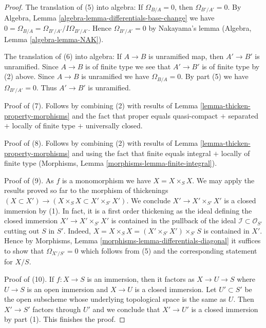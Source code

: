 \begin{proof}
\medskip\noindent
The translation of (5) into algebra: If $\Omega_{B/A} = 0$, then
$\Omega_{B'/A'} = 0$. By
Algebra, Lemma \ref{algebra-lemma-differentials-base-change}
we have $0 = \Omega_{B/A} = \Omega_{B'/A'}/I\Omega_{B'/A'}$.
Hence $\Omega_{B'/A'} = 0$ by
Nakayama's lemma (Algebra, Lemma \ref{algebra-lemma-NAK}).

\medskip\noindent
The translation of (6) into algebra: If $A \to B$ is unramified
map, then $A' \to B'$ is unramified. Since $A \to B$ is of finite
type we see that $A' \to B'$ is of finite type by (2) above.
Since $A \to B$ is unramified we have $\Omega_{B/A} = 0$. By
part (5) we have $\Omega_{B'/A'} = 0$. Thus $A' \to B'$ is unramified.

\medskip\noindent
Proof of (7). Follows by combining (2) with
results of Lemma \ref{lemma-thicken-property-morphisms}
and the fact that proper equals quasi-compact $+$
separated $+$ locally of finite type $+$ universally closed.

\medskip\noindent
Proof of (8). Follows by combining (2) with
results of Lemma \ref{lemma-thicken-property-morphisms}
and using the fact that finite equals integral $+$ locally
of finite type (Morphisms, Lemma \ref{morphisms-lemma-finite-integral}).

\medskip\noindent
Proof of (9). As $f$ is a monomorphism we have $X = X \times_S X$.
We may apply the results proved so far to the morphism of thickenings
$(X \subset X') \to (X \times_S X \subset X' \times_{S'} X')$.
We conclude $X' \to X' \times_{S'} X'$ is a closed immersion by (1).
In fact, it is a first order thickening as the ideal defining the
closed immersion
$X' \to X' \times_{S'} X'$ is contained in the pullback of the ideal
$\mathcal{I} \subset \mathcal{O}_{S'}$ cutting out $S$ in $S'$.
Indeed, $X = X \times_S X = (X' \times_{S'} X') \times_{S'} S$
is contained in $X'$. Hence by
Morphisms, Lemma \ref{morphisms-lemma-differentials-diagonal}
it suffices to show that
$\Omega_{X'/S'} = 0$ which follows from (5)
and the corresponding statement for $X/S$.

\medskip\noindent
Proof of (10). If $f : X \to S$ is an immersion, then it factors as
$X \to U \to S$ where $U \to S$ is an open immersion and $X \to U$ is a
closed immersion. Let $U' \subset S'$ be the open subscheme whose
underlying topological space is the same as $U$. Then $X' \to S'$
factors through $U'$ and we conclude that $X' \to U'$ is a closed
immersion by part (1). This finishes the proof.
\end{proof}

